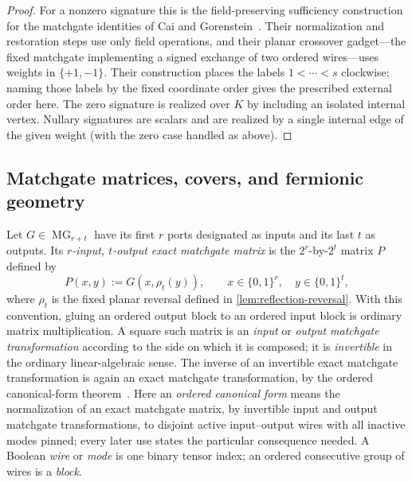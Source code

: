 \documentclass[11pt]{article}
\theoremstyle{definition}
\theoremstyle{remark}
\newcommand{\bits}{\{0,1\}}
\newcommand{\MG}{\operatorname{MG}}
\begin{document}
\begin{proof}
For a nonzero signature this is the field-preserving sufficiency
construction for the matchgate identities of Cai and
Gorenstein~\cite[Section~5 and Theorem~5.1]{CaiGorenstein2014}.  Their
normalization and restoration steps use only field operations, and their
planar crossover gadget---the fixed matchgate implementing a signed exchange
of two ordered wires---uses weights in $\{+1,-1\}$.  Their construction
places the labels $1<\cdots<s$ clockwise; naming those labels by the fixed
coordinate order gives the prescribed external order here.  The zero signature is
realized over $K$ by including an isolated internal vertex.  Nullary
signatures are scalars and are realized by a single internal edge of the
given weight (with the zero case handled as above).
\end{proof}

\subsection{Matchgate matrices, covers, and fermionic geometry}
\label{sec:matchgate-matrix-preliminaries}

Let $G\in\MG_{r+t}$ have its first $r$ ports designated as inputs and its
last $t$ as outputs.  Its \emph{$r$-input, $t$-output exact matchgate matrix}
is the $2^r$-by-$2^t$ matrix $P$ defined by
\begin{equation}
P(x,y):=G(x,\rho_t(y)),
  \qquad x\in\bits^r,\quad y\in\bits^t,
  \label{eq:matchgate-matrix-convention}
\end{equation}
where $\rho_t$ is the fixed planar reversal defined in
\cref{lem:reflection-reversal}.
With this convention, gluing an ordered output block to an ordered input
block is ordinary
matrix multiplication.  A square such matrix is an \emph{input} or
\emph{output matchgate transformation} according to the side on which it
is composed; it is \emph{invertible} in the ordinary linear-algebraic
sense.  The inverse of an invertible exact matchgate transformation is
again an exact matchgate transformation, by the ordered canonical-form
theorem~\cite{CaiChoudharyLu2009,Xia2016}.  Here an \emph{ordered canonical
form} means the normalization of an exact matchgate matrix, by invertible
input and output matchgate transformations, to disjoint active
input--output wires with all inactive modes pinned; every later use states
the particular consequence needed.  A Boolean \emph{wire} or
\emph{mode} is one binary tensor index;
an ordered consecutive group of wires is a \emph{block}.
\end{document}
